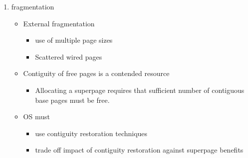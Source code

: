 \documentclass[12pt]{article}
\begin{document}
\begin{enumerate}
    \item fragmentation \begin{itemize}
        \item External fragmentation \begin{itemize}
            \item use of multiple page sizes
            \item Scattered wired pages
        \end{itemize}
        \item Contiguity of free pages is a contended resource \begin{itemize}
            \item Allocating a superpage requires that sufficient number of contiguous base pages must be free.
        \end{itemize}
        \item OS must \begin{itemize}
            \item use contiguity restoration techniques
            \item trade off impact of contiguity restoration against superpage benefits
        \end{itemize}
    \end{itemize}
\end{enumerate}
\end{document}
